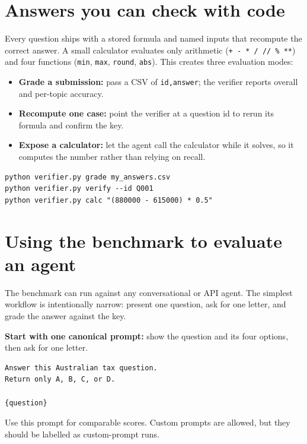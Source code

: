 \documentclass[11pt]{article}
\begin{document}
\section{Answers you can check with code}

Every question ships with a stored formula and named inputs that recompute the correct answer. A small calculator evaluates only arithmetic (\texttt{+ - * / // \% **}) and four functions (\texttt{min}, \texttt{max}, \texttt{round}, \texttt{abs}). This creates three evaluation modes:

\begin{itemize}
  \item \textbf{Grade a submission:} pass a CSV of \texttt{id,answer}; the verifier reports overall and per-topic accuracy.
  \item \textbf{Recompute one case:} point the verifier at a question id to rerun its formula and confirm the key.
  \item \textbf{Expose a calculator:} let the agent call the calculator while it solves, so it computes the number rather than relying on recall.
\end{itemize}

\begin{Verbatim}[fontsize=\small,frame=single,rulecolor=\color{line}]
python verifier.py grade my_answers.csv
python verifier.py verify --id Q001
python verifier.py calc "(880000 - 615000) * 0.5"
\end{Verbatim}

\section{Using the benchmark to evaluate an agent}

The benchmark can run against any conversational or API agent. The simplest workflow is intentionally narrow: present one question, ask for one letter, and grade the answer against the key.

\textbf{Start with one canonical prompt:} show the question and its four options, then ask for one letter.

\begin{Verbatim}[fontsize=\small,frame=single,rulecolor=\color{line}]
Answer this Australian tax question.
Return only A, B, C, or D.

{question}
\end{Verbatim}

Use this prompt for comparable scores. Custom prompts are allowed, but they should be labelled as custom-prompt runs.
\end{document}
